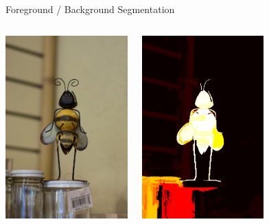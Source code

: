 \documentclass[mathserif]{beamer}
\begin{document}
\begin{frame}{Foreground / Background Segmentation}
\vspace{0.5em}
\begin{columns}[c]
\centering
\includegraphics[width=1.85in]{figures/bee.jpg}

\centering
\includegraphics[width=1.85in]{figures/bee_marginals.png}
\end{columns}
\end{frame}
\end{document}
